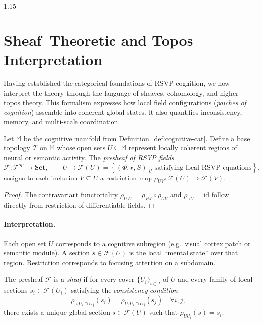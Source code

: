 \documentclass[12pt,a4paper]{article}
\begin{document}
\begin{spacing}{1.15}
\section{Sheaf–Theoretic and Topos Interpretation}
\label{sec:sheaf-topos}

Having established the categorical foundations of RSVP cognition, we now interpret the theory
through the language of sheaves, cohomology, and higher topos theory.
This formalism expresses how local field configurations (\emph{patches of cognition})
assemble into coherent global states.
It also quantifies inconsistency, memory, and multi-scale coordination.

\begin{definition}
\label{def:presheaf}
Let \(\mathbb{M}\) be the cognitive manifold from Definition~\ref{def:cognitive-cat}.
Define a base topology \(\mathcal{T}\) on \(\mathbb{M}\)
whose open sets \(U\subseteq \mathbb{M}\) represent locally coherent
regions of neural or semantic activity.
The \emph{presheaf of RSVP fields}
\[
  \mathscr{F} : \mathcal{T}^{op} \to \mathbf{Set}, \qquad
  U \mapsto \mathscr{F}(U) =
  \left\{ (\Phi,\boldsymbol{\mathcal{v}},S)\big|_U
           \text{ satisfying local RSVP equations} \right\},
\]
assigns to each inclusion \(V\subseteq U\)
a restriction map
\(\rho_{UV} : \mathscr{F}(U)\to\mathscr{F}(V)\).
\end{definition}

\begin{proof}
The contravariant functoriality
\(\rho_{UW}\!=\!\rho_{VW}\!\circ\!\rho_{UV}\)
and \(\rho_{UU}=\mathrm{id}\)
follow directly from restriction of differentiable fields.
\end{proof}

\paragraph{Interpretation.}
Each open set \(U\) corresponds to a cognitive subregion
(e.g.\ visual cortex patch or semantic module).
A section \(s\in\mathscr{F}(U)\)
is the local “mental state” over that region.
Restriction corresponds to focusing attention on a subdomain.

\begin{definition}
\label{def:sheaf-cond}
The presheaf \(\mathscr{F}\) is a \emph{sheaf}
if for every cover \(\{U_i\}_{i\in I}\) of \(U\)
and every family of local sections \(s_i\in\mathscr{F}(U_i)\)
satisfying the \emph{consistency condition}
\[
  \rho_{U_iU_i\cap U_j}(s_i)
  =\rho_{U_jU_i\cap U_j}(s_j)
  \quad \forall i,j,
\]
there exists a unique global section
\(s\in\mathscr{F}(U)\)
such that \(\rho_{UU_i}(s)=s_i\).
\end{definition}


\end{spacing}
\end{document}
